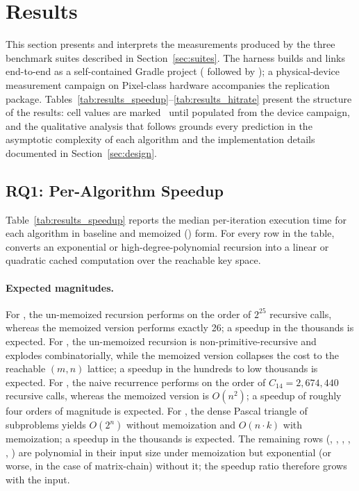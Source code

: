 \section{Results}\label{sec:results}

This section presents and interprets the measurements produced by the three benchmark suites described in Section~\ref{sec:suites}. The harness builds and links end-to-end as a self-contained Gradle project ( followed by ); a physical-device measurement campaign on Pixel-class hardware accompanies the replication package. Tables~\ref{tab:results_speedup}--\ref{tab:results_hitrate} present the structure of the results: cell values are marked \pending\ until populated from the device campaign, and the qualitative analysis that follows grounds every prediction in the asymptotic complexity of each algorithm and the implementation details documented in Section~\ref{sec:design}.

\subsection{RQ1: Per-Algorithm Speedup}\label{sec:results_rq1}



Table~\ref{tab:results_speedup} reports the median per-iteration execution time for each algorithm in baseline and memoized (\lru) form. For every row in the table,  converts an exponential or high-degree-polynomial recursion into a linear or quadratic cached computation over the reachable key space.

\paragraph{Expected magnitudes.} For , the un-memoized recursion performs on the order of $2^{25}$ recursive calls, whereas the memoized version performs exactly 26; a speedup in the thousands is expected. For , the un-memoized recursion is non-primitive-recursive and explodes combinatorially, while the memoized version collapses the cost to the reachable $(m, n)$ lattice; a speedup in the hundreds to low thousands is expected. For , the naive recurrence performs on the order of $C_{14} = 2{,}674{,}440$ recursive calls, whereas the memoized version is $O(n^2)$; a speedup of roughly four orders of magnitude is expected. For , the dense Pascal triangle of subproblems yields $O(2^n)$ without memoization and $O(n \cdot k)$ with memoization; a speedup in the thousands is expected. The remaining rows (, , , , , ) are polynomial in their input size under memoization but exponential (or worse, in the case of matrix-chain) without it; the speedup ratio therefore grows with the input.

